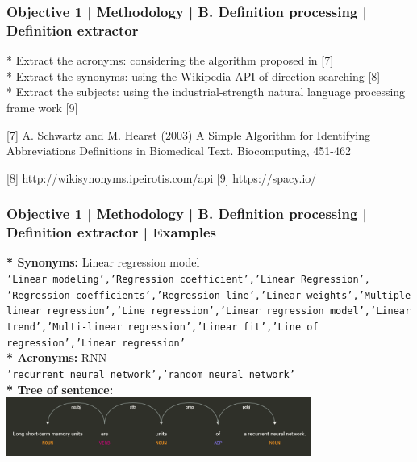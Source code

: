 \documentclass{beamer}
\newcommand{\code}[1]{{\texttt{#1}}}
\begin{document}
\begin{frame}
\frametitle{Objective 1 | Methodology | B. Definition processing | Definition extractor}

	* Extract the acronyms:  considering the algorithm proposed in [7]\\
	* Extract the synonyms: using the Wikipedia API of direction searching [8]\\
	* Extract the subjects: using the industrial-strength natural language processing frame work [9]
	
	
	\begin{thebibliography}{01}
	{\scriptsize 	{}  A. Schwartz and M. Hearst (2003) A Simple Algorithm for Identifying Abbreviations Definitions in Biomedical Text. Biocomputing, 451-462	
		
		  http://wikisynonyms.ipeirotis.com/api
		 [9] https://spacy.io/}
	\end{thebibliography}
	
	
\end{frame}

\begin{frame}
\frametitle{Objective 1 | Methodology | B. Definition processing | Definition extractor | Examples}
{\small \textbf{* Synonyms:}  Linear regression model \\
	\code{'Linear modeling','Regression coefficient','Linear Regression', 'Regression coefficients','Regression line','Linear weights','Multiple linear regression','Line regression','Linear regression model','Linear trend','Multi-linear regression','Linear fit','Line of regression','Linear regression'} \\
\textbf{* Acronyms:} RNN\\
\code{'recurrent neural network','random neural network'} \\
\textbf{* Tree of sentence:} \\}
		\includegraphics[width=100mm]{spa.png}
\end{frame}
\end{document}
